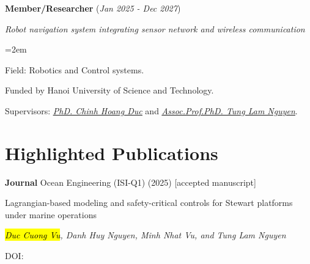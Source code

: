 \documentclass[10pt]{article}
\let\oldhref\href
\renewcommand{\href}[2]{\oldhref{#1}{\ul{#2}}}
\newlength{\skilllabelwidth}
\newcommand{\skill}[2]{%
	\noindent
	\parbox[t]{\skilllabelwidth}{\raggedright\textbf{#1}}%
	\hspace{0.5em}%
	\parbox[t]{\dimexpr\linewidth-\skilllabelwidth-0.5em\relax}{%
		\hangindent=0pt\hangafter=0 #2%
	}\par\vspace{0.15cm}
}
\newcommand{\project}[4]{%
	\noindent \textbf{#1} (\textit{#2})\par
	\vspace{0.5em}
	\noindent \textit{#3}\par
	\vspace{0.5em}
	\noindent\hangindent=2em\hangafter=0 #4 \par\normalsize
}
\newcommand{\publication}[5]{%
	\noindent \textbf{#1} \hspace{0.1cm} #2 \par
	\vspace{0.5em}
	\noindent #3 \par
	\vspace{0.5em}
	\noindent \textit{#4} \par
	\vspace{0.5em}
	\noindent DOI: \href{https://doi.org/#5}{#5} \par
}
\begin{document}
		\project{Member/Researcher}{Jan 2025 - Dec 2027}{Robot navigation system integrating sensor network and wireless communication}
		{\begin{soloitemize}
				\item Field: Robotics and Control systems.
				\item Funded by Hanoi University of Science and Technology.
				\item Supervisors: \href{https://scholar.google.com/citations?user=mI561CkAAAAJ&hl=en}{\textit{PhD. Chinh Hoang Duc}} 
				and 
				\href{https://scholar.google.com/citations?user=MlJ_2-wAAAAJ&hl=en}{\textit{Assoc.Prof.PhD. Tung Lam Nguyen}}.
		\end{soloitemize}
		}

	
%	
%	
%	
%	
%	
%	
	
	
	
	
	\section*{Highlighted Publications}
	\publication{Journal}
	{Ocean Engineering (ISI-Q1) (2025) [accepted manuscript]}
	{Lagrangian-based modeling and safety-critical controls for Stewart platforms under marine operations}
	{\hl{Duc Cuong Vu}, Danh Huy Nguyen, Minh Nhat Vu, and Tung Lam Nguyen}
	{}
	
\end{document}
